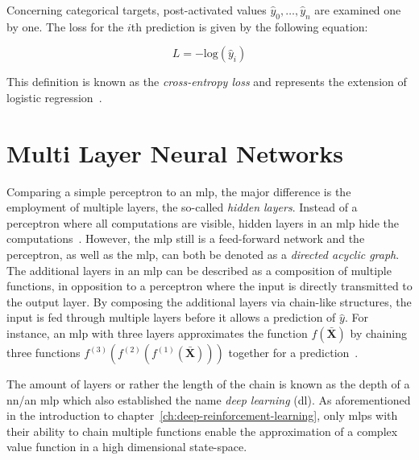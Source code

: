 \documentclass[draft,final]{vutinfth} %
\newcommand{\p}[1]{see p. #1}
\begin{document}
    Concerning categorical targets, post-activated values $\hat{y}_0,\ldots,\hat{y}_n$ are examined one by one.
    The loss for the $i$th prediction is given by the following equation:

    \begin{equation}
        L=-\text{log}(\hat{y}_i)
    \end{equation}

    This definition is known as the \textit{cross-entropy loss} and represents the extension of logistic regression~\citep[\p{15}]{aggarwal_neural_2018}.


    \section{Multi Layer Neural Networks}
    Comparing a simple perceptron to an \gls{mlp}, the major difference is the employment of multiple layers, the so-called \textit{hidden layers}.
    Instead of a perceptron where all computations are visible, hidden layers in an \gls{mlp} hide the computations~\citep[\p{17}]{aggarwal_neural_2018}.
    However, the \gls{mlp} still is a feed-forward network and the perceptron, as well as the \gls{mlp}, can both be denoted as a \textit{directed acyclic graph}.
    The additional layers in an \gls{mlp} can be described as a composition of multiple functions, in opposition to a perceptron where the input is directly transmitted to the output layer.
    By composing the additional layers via chain-like structures, the input is fed through multiple layers before it allows a prediction of $\hat{y}$.
    For instance, an \gls{mlp} with three layers approximates the function $f(\bar{\boldsymbol{X}})$ by chaining three functions $f^{(3)}(f^{(2)}(f^{(1)}(\bar{\boldsymbol{X}})))$ together for a prediction~\citep[\p{163f}]{goodfellow_deep_2016}.

    The amount of layers or rather the length of the chain is known as the depth of a \gls{nn}/an \gls{mlp} which also established the name \textit{deep learning} (\gls{dl}).
    As aforementioned in the introduction to chapter~\ref{ch:deep-reinforcement-learning}, only \glspl{mlp} with their ability to chain multiple functions enable the approximation of a complex value function in a high dimensional state-space.
\end{document}
